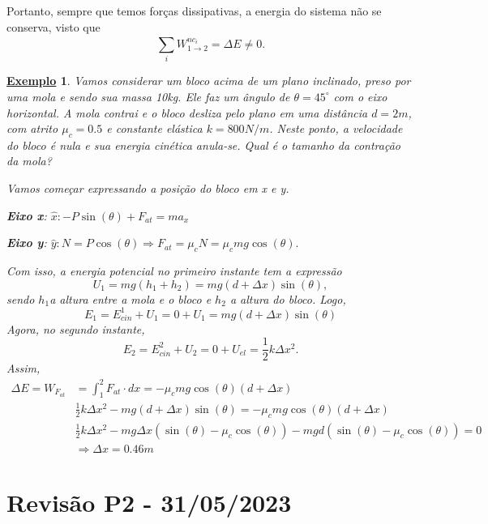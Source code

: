 \documentclass{article}
\newtheorem{example}{\underline{Exemplo}}
\begin{document}
   Portanto, sempre que temos for\c cas dissipativas, a energia do sistema não se conserva, visto que 
     \[
       \sum\limits_{i}^{}W_{1\rightarrow2}^{nc_{i}} = \Delta E\neq 0.
     \]
    \begin{example}
      Vamos considerar um bloco acima de um plano inclinado, preso por uma mola e sendo sua massa 10kg.
    Ele faz um ângulo de \(\theta =45^{\circ}\) com o eixo horizontal. A mola contrai e o bloco desliza pelo plano em uma distância \(d=2m\),
    com atrito \(\mu_{c}=0.5\) e constante elástica \(k=800N/m\). Neste ponto, a velocidade do bloco é nula e
    sua energia cinética anula-se. Qual é o tamanho da contra\c cão da mola?

      Vamos come\c car expressando a posi\c cão do bloco em x e y.
       
      \textbf{Eixo x}: \(\hat{x}: -P\sin{(\theta )} + F_{at} = ma_{x}\)

      \textbf{Eixo y}: \(\hat{y}: N = P\cos{(\theta )} \Rightarrow F_{at}=\mu_{c}N = \mu_{c}mg\cos{(\theta )}.\)

      Com isso, a energia potencial no primeiro instante tem a expressão 
        \[
          U_{1} = mg(h_{1}+h_{2}) = mg(d+\Delta x)\sin{(\theta )},
        \]
        sendo \(h_{1}\)a altura entre a mola e o bloco e \(h_{2}\) a altura do bloco. Logo, 
          \[
            E_{1} = E_{cin}^{1} + U_{1} = 0 + U_{1} = mg(d + \Delta x)\sin(\theta )
          \]
        Agora, no segundo instante, 
          \[
            E_{2} = E_{cin}^{2} + U_{2} = 0 + U_{el} = \frac{1}{2}k\Delta x^{2}.
          \]
        Assim, 
       \begin{align*}
         \Delta E = W_{F_{at}} &= \int_{1}^{2} F_{at}\cdot dx = -\mu_{c}mg\cos{(\theta )}(d+\Delta x)\\
                               &\frac{1}{2}k\Delta x^{2} - mg(d+\Delta x)\sin{(\theta )} = -\mu_{c}mg\cos{(\theta )}(d+\Delta x)\\
                               &\frac{1}{2}k\Delta x^{2} - mg\Delta x(\sin{(\theta )}-\mu_c\cos{(\theta )}) - mgd(\sin{(\theta )}-\mu_{c}\cos{(\theta )})=0\\
                               &\Rightarrow \Delta x=0.46m
       \end{align*}
    \end{example}
\newpage

\section{Revisão P2 - 31/05/2023}
\end{document}
